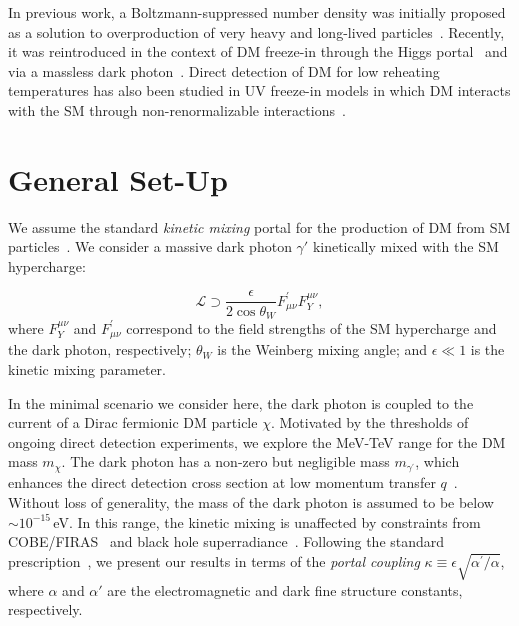 In previous work, a Boltzmann-suppressed number density was initially proposed as a solution to overproduction of very heavy and long-lived particles~\cite{Kuzmin:1997jua}. Recently, it was reintroduced in the context of DM freeze-in through the Higgs portal~\cite{Bringmann:2021sth,Cosme:2023xpa,Cosme:2024ndc,Arcadi:2024wwg} and via a massless dark photon~\cite{Gan:2023jbs}. Direct detection of DM for low reheating temperatures has also been studied in UV freeze-in models in which DM interacts with the SM through non-renormalizable interactions~\cite{Essig:2011nj,Bhattiprolu:2022sdd}.


\section{General Set-Up}
\label{sec:ch8-setup}

We assume the standard \textit{kinetic mixing} portal for the production of DM from SM particles~\cite{GALISON1984279,Holdom:1985ag,Ackerman:2008kmp,Feng:2008mu,Feng:2009mn}. We consider a massive dark photon $\gamma'$ kinetically mixed with the SM hypercharge:

\begin{equation}
    \mathcal{L}\supset
    \frac{\epsilon}{2 \cos\theta_W}F^\prime_{\mu\nu}F_Y^{\mu\nu},
    \label{eq:ch8-lagrangian}
\end{equation}
where $F_Y^{\mu\nu}$ and $F^\prime_{\mu\nu}$ correspond to the field strengths of the SM hypercharge and the dark photon, respectively; $\theta_W$ is the Weinberg mixing angle; and $\epsilon\ll 1$ is the kinetic mixing parameter.

In the minimal scenario we consider here, the dark photon is coupled to the current of a Dirac fermionic DM particle $\chi$. Motivated by the thresholds of ongoing direct detection experiments, we explore the MeV-TeV range for the DM mass $m_\chi$. The dark photon has a non-zero but negligible mass $m_{\gamma^\prime}$, which enhances the direct detection cross section at low momentum transfer $q$~\cite{Essig:2011nj}. Without loss of generality, the mass of the dark photon is assumed to be below $\sim 10^{-15}\,$eV. In this range, the kinetic mixing is unaffected by constraints from COBE/FIRAS~\cite{Fixsen:1996nj,Caputo:2020bdy} and black hole superradiance~\cite{Baryakhtar:2017ngi,Siemonsen:2022ivj}.
Following the standard prescription~\cite{Chu:2011be}, we present our results in terms of the \textit{portal coupling} $\kappa\equiv \epsilon \sqrt{\alpha^\prime/\alpha}$, where $\alpha$ and $\alpha'$ are the electromagnetic and dark fine structure constants, respectively.

